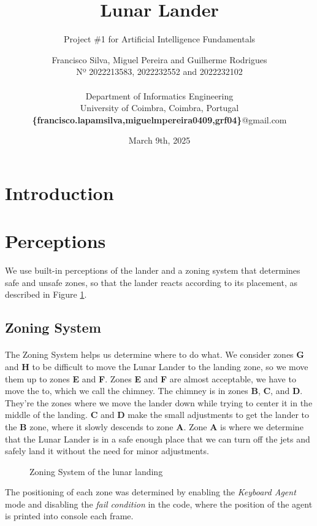 \documentclass{article}
\title{\textbf{Lunar Lander}}
\subtitle{Project \#1 for Artificial Intelligence Fundamentals}
\author{Francisco Silva, Miguel Pereira and Guilherme Rodrigues 
\\ Nº 2022213583, 2022232552 and 2022232102 \\ \\
Department of Informatics Engineering \\
University of Coimbra, Coimbra, Portugal
\\ \textbf{\{francisco.lapamsilva,miguelmpereira0409,grf04\}}@gmail.com}
\date{March 9th, 2025}
\begin{document}
\maketitle

\newpage
\tableofcontents
\newpage

\section{Introduction}



\section{Perceptions}
We use built-in perceptions of the lander and a zoning system that determines safe and unsafe zones, so that the lander reacts according to its placement, as described in Figure \ref{fig:zoningsystem}.
\subsection{Zoning System}
\paragraph{}The Zoning System helps us determine where to do what. We consider zones \textbf{G} and \textbf{H} to be difficult to move the Lunar Lander to the landing zone, so we move them up to zones \textbf{E} and \textbf{F}. Zones \textbf{E} and \textbf{F} are almost acceptable, we have to move the to, which we call the chimney.  The chimney is in zones \textbf{B}, \textbf{C}, and \textbf{D}. They're the zones where we move the lander down while trying to center it in the middle of the landing. \textbf{C} and \textbf{D} make the small adjustments to get the lander to the \textbf{B} zone, where it slowly descends to zone \textbf{A}.  Zone \textbf{A} is where we determine that the Lunar Lander is in a safe enough place that we can turn off the jets and safely land it without the need for minor adjustments.

\begin{figure}[htbp]
\centering

\caption{\label{fig:zoningsystem}Zoning System of the lunar landing}
\end{figure}

The positioning of each zone was determined by enabling the \textit{Keyboard Agent} mode and disabling the \textit{fail condition} in the code, where the position of the agent is printed into console each frame. 
\end{document}

